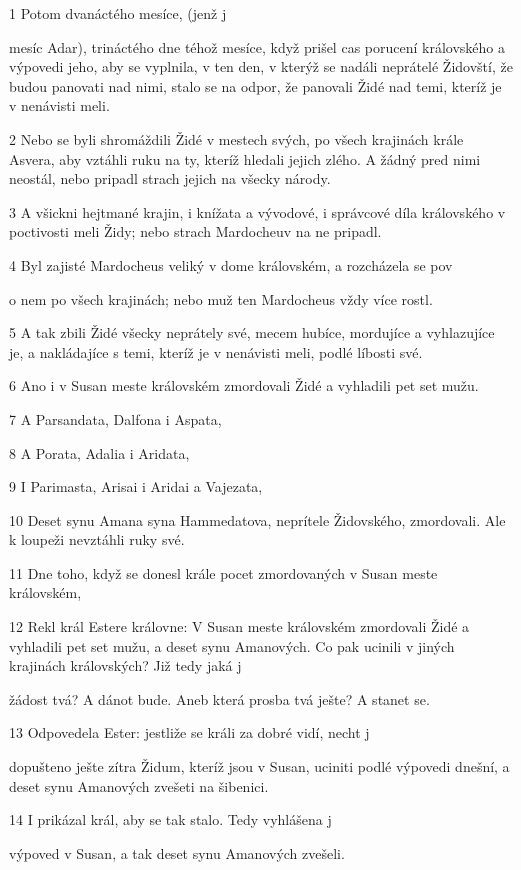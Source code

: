 \par 1 Potom dvanáctého mesíce, (jenž j\par mesíc Adar), trináctého dne téhož mesíce, když prišel cas porucení královského a výpovedi jeho, aby se vyplnila, v ten den, v kterýž se nadáli neprátelé Židovští, že budou panovati nad nimi, stalo se na odpor, že panovali Židé nad temi, kteríž je v nenávisti meli.
\par 2 Nebo se byli shromáždili Židé v mestech svých, po všech krajinách krále Asvera, aby vztáhli ruku na ty, kteríž hledali jejich zlého. A žádný pred nimi neostál, nebo pripadl strach jejich na všecky národy.
\par 3 A všickni hejtmané krajin, i knížata a vývodové, i správcové díla královského v poctivosti meli Židy; nebo strach Mardocheuv na ne pripadl.
\par 4 Byl zajisté Mardocheus veliký v dome královském, a rozcházela se pov\par o nem po všech krajinách; nebo muž ten Mardocheus vždy více rostl.
\par 5 A tak zbili Židé všecky neprátely své, mecem hubíce, mordujíce a vyhlazujíce je, a nakládajíce s temi, kteríž je v nenávisti meli, podlé líbosti své.
\par 6 Ano i v Susan meste královském zmordovali Židé a vyhladili pet set mužu.
\par 7 A Parsandata, Dalfona i Aspata,
\par 8 A Porata, Adalia i Aridata,
\par 9 I Parimasta, Arisai i Aridai a Vajezata,
\par 10 Deset synu Amana syna Hammedatova, neprítele Židovského, zmordovali. Ale k loupeži nevztáhli ruky své.
\par 11 Dne toho, když se donesl krále pocet zmordovaných v Susan meste královském,
\par 12 Rekl král Estere královne: V Susan meste královském zmordovali Židé a vyhladili pet set mužu, a deset synu Amanových. Co pak ucinili v jiných krajinách královských? Již tedy jaká j\par žádost tvá? A dánot bude. Aneb která prosba tvá ješte? A stanet se.
\par 13 Odpovedela Ester: jestliže se králi za dobré vidí, necht j\par dopušteno ješte zítra Židum, kteríž jsou v Susan, uciniti podlé výpovedi dnešní, a deset synu Amanových zvešeti na šibenici.
\par 14 I prikázal král, aby se tak stalo. Tedy vyhlášena j\par výpoved v Susan, a tak deset synu Amanových zvešeli.
